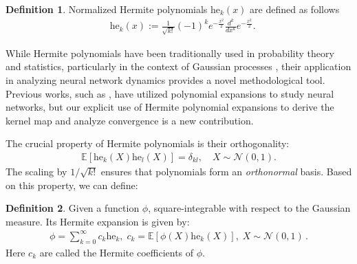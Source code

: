 \documentclass[twoside]{article}
\newcommand{\E}{\mathbb{E}}
\newcommand{\he}{\mathrm{he}}
\newcommand{\He}{\mathrm{He}}
\theoremstyle{definition}
\newtheorem{definition}{Definition}
\newcommand{\thomas}[1]{{\color{blue}TH:  \textit{#1}}}
\begin{document}
\begin{definition}
Normalized Hermite polynomials $\he_k(x)$ are defined as follows
\begin{align*}
&\he_k(x) :=\frac{1}{\sqrt{k!}}(-1)^k e^{-\frac{x^2}{2}} \frac{d^k}{dx^k} e^{-\frac{x^2}{2}}.
\end{align*}
\end{definition}

While Hermite polynomials have been traditionally used in probability theory and statistics, particularly in the context of Gaussian processes \citep{williams2006gaussian}, their application in analyzing neural network dynamics provides a novel methodological tool. Previous works, such as \citet{daniely2016toward}, have utilized polynomial expansions to study neural networks, but our explicit use of Hermite polynomial expansions to derive the kernel map and analyze convergence is a new contribution.




The crucial property of Hermite polynomials is their  orthogonality:
\begin{align}\label{eq:hermite_orthogonality}
\E\left[\he_k(X)\he_l(X)\right] = \delta_{kl}, \quad X \sim \mathcal N(0,1).
\end{align}
The scaling by $1/\sqrt{k!}$ ensures that polynomials form an \emph{orthonormal} basis.  Based on this property, we can define:
\begin{definition}\label{def:hermite_expansion}
Given a function $\phi$, square-integrable with respect to the Gaussian measure. Its Hermite expansion is given by:
\begin{align*}
\phi = \sum_{k=0}^\infty c_k \he_k,\; c_k = \E\left[\phi(X) \he_k(X)\right], \; X \sim \mathcal N (0,1)\,.
\end{align*}
Here $c_k$ are called the Hermite coefficients of $\phi$. 
\end{definition}
\end{document}
